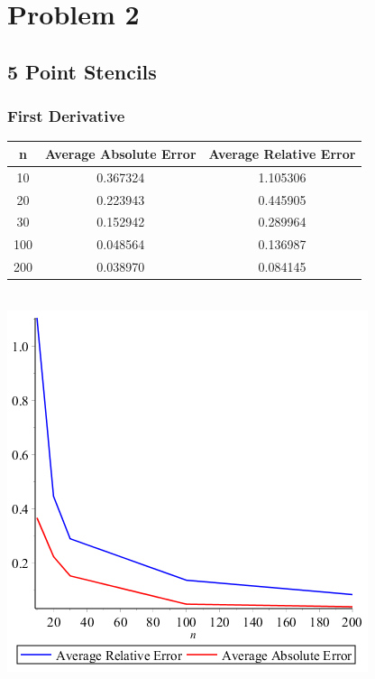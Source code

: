 \documentclass[11pt,fleqn]{article} %
\begin{document}
\section*{Problem 2}
\subsection*{5 Point Stencils}
\subsubsection*{First Derivative}
\begin{tabular}{c | c | c }
n & Average Absolute Error & Average Relative Error \\
\hline
10 & 0.367324 & 1.105306 \\
20 & 0.223943& 0.445905\\
30 &0.152942&  0.289964\\
100 & 0.048564 & 0.136987 \\
200 &0.038970 &0.084145\\
\end{tabular}\\
\includegraphics[scale=.5]{plots/problem2firstderivplot.png}
\end{document}
